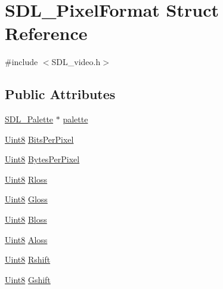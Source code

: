 \hypertarget{struct_s_d_l___pixel_format}{}\section{S\+D\+L\+\_\+\+Pixel\+Format Struct Reference}
\label{struct_s_d_l___pixel_format}


{\ttfamily \#include $<$S\+D\+L\+\_\+video.\+h$>$}

\subsection*{Public Attributes}
\begin{DoxyCompactItemize}
\item 
\hyperlink{struct_s_d_l___palette}{S\+D\+L\+\_\+\+Palette} $\ast$ \hyperlink{struct_s_d_l___pixel_format_aeae611aba76f5eb11b696807926c5116}{palette}
\item 
\hyperlink{_s_d_l__stdinc_8h_a2944638813a090aa23e62f4da842c3e2}{Uint8} \hyperlink{struct_s_d_l___pixel_format_aac533fae3043ef44df01108248e111d8}{Bits\+Per\+Pixel}
\item 
\hyperlink{_s_d_l__stdinc_8h_a2944638813a090aa23e62f4da842c3e2}{Uint8} \hyperlink{struct_s_d_l___pixel_format_a6fec9e1809cc3da458d58b8cccd058f2}{Bytes\+Per\+Pixel}
\item 
\hyperlink{_s_d_l__stdinc_8h_a2944638813a090aa23e62f4da842c3e2}{Uint8} \hyperlink{struct_s_d_l___pixel_format_a9994b4ed87a2551253aebfa191db8424}{Rloss}
\item 
\hyperlink{_s_d_l__stdinc_8h_a2944638813a090aa23e62f4da842c3e2}{Uint8} \hyperlink{struct_s_d_l___pixel_format_a94469768d8436e631a13d68623ff663f}{Gloss}
\item 
\hyperlink{_s_d_l__stdinc_8h_a2944638813a090aa23e62f4da842c3e2}{Uint8} \hyperlink{struct_s_d_l___pixel_format_a337072c1bc8b41efdd2da4e95b8c2ff7}{Bloss}
\item 
\hyperlink{_s_d_l__stdinc_8h_a2944638813a090aa23e62f4da842c3e2}{Uint8} \hyperlink{struct_s_d_l___pixel_format_a660e95097874088292f1289a458efaa2}{Aloss}
\item 
\hyperlink{_s_d_l__stdinc_8h_a2944638813a090aa23e62f4da842c3e2}{Uint8} \hyperlink{struct_s_d_l___pixel_format_abfdec7b9ee2ee39db630f4022e4e0daa}{Rshift}
\item 
\hyperlink{_s_d_l__stdinc_8h_a2944638813a090aa23e62f4da842c3e2}{Uint8} \hyperlink{struct_s_d_l___pixel_format_a6045012f994c02a86bdc4a91b28d2a3c}{Gshift}
\item 

\end{DoxyCompactItemize}
